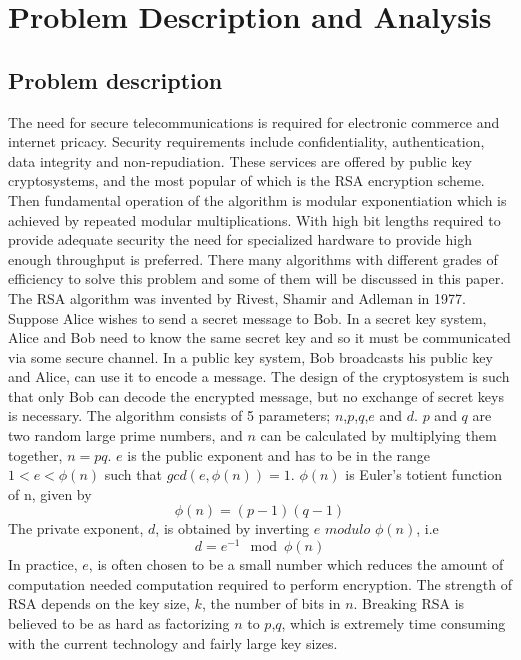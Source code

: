 \section{Problem Description and Analysis}
%
%
\subsection{Problem description}
The need for secure telecommunications is required for electronic commerce and internet pricacy. Security requirements include confidentiality, authentication, data integrity and non-repudiation. These services are offered by public key cryptosystems, and the most popular of which is the RSA encryption scheme. Then fundamental operation of the algorithm is modular exponentiation which is achieved by repeated modular multiplications. With high bit lengths required to provide adequate security the need for specialized hardware to provide high enough throughput is preferred. There many algorithms with different grades of efficiency to solve this problem and some of them will be discussed in this paper.
%
The RSA algorithm was invented by Rivest, Shamir and Adleman in 1977. Suppose Alice wishes to send a secret message to Bob. In a secret key system, Alice and Bob need to know the same secret key and so it must be communicated via some secure channel. In a public key system, Bob broadcasts his public key and Alice, can use it to encode a message. The design of the cryptosystem is such that only Bob can decode the encrypted message, but no exchange of secret keys is necessary. 
%
The algorithm consists of 5 parameters; $n$,$p$,$q$,$e$ and $d$. 
$p$ and $q$ are two random large prime numbers, and $n$ can be calculated by multiplying 
them together, $n=pq$. $e$ is the public exponent and has to be in the range $1<e<\phi(n)$ 
such that $gcd(e,\phi(n))=1$. $\phi(n)$ is Euler's totient function of n, given by
%
\begin{equation}
    \phi(n)=(p-1)(q-1)
\end{equation}
%
The private exponent, $d$, is obtained by inverting $e$ $modulo$ $\phi(n)$, i.e
%
\begin{equation}
    d=e^{-1}\mod{\phi(n)}
\end{equation}
%
In practice, $e$, is often chosen to be a small number which reduces the amount of computation needed computation required to perform encryption. The strength of RSA depends on the key size, $k$, the number of bits in $n$. Breaking RSA is believed to be as hard as factorizing $n$ to $p$,$q$, which is extremely time consuming with the current technology and fairly large key sizes. 
